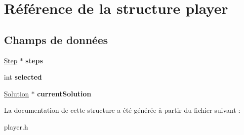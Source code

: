 \hypertarget{structplayer}{\section{Référence de la structure player}
\label{structplayer}
}
\subsection*{Champs de données}
\begin{DoxyCompactItemize}
\item 
\hypertarget{structplayer_a9e027465ed2f9e1258ba283809c118df}{\hyperlink{struct_step}{Step} $\ast$ {\bfseries steps}}\label{structplayer_a9e027465ed2f9e1258ba283809c118df}

\item 
\hypertarget{structplayer_adab4da51ba40d5a492becdceccccbfcd}{int {\bfseries selected}}\label{structplayer_adab4da51ba40d5a492becdceccccbfcd}

\item 
\hypertarget{structplayer_a2a1d123731a9be1e0ed2e323791c9371}{\hyperlink{struct_solution}{Solution} $\ast$ {\bfseries current\-Solution}}\label{structplayer_a2a1d123731a9be1e0ed2e323791c9371}

\end{DoxyCompactItemize}


La documentation de cette structure a été générée à partir du fichier suivant \-:\begin{DoxyCompactItemize}
\item 
player.\-h\end{DoxyCompactItemize}
